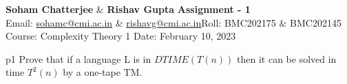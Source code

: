 \documentclass[a4paper, 11pt]{article}
\begin{document}
	
	
\textsf{\noindent \large\textbf{Soham Chatterjee} \& \textbf{Rishav Gupta} \hfill \textbf{Assignment - 1}\\
    Email: \href{sohamc@cmi.ac.in}{sohamc@cmi.ac.in} \& \href{rishavg@cmi.ac.in}{rishavg@cmi.ac.in}\hfill Roll: BMC202175 \& BMC202145\\
		\normalsize Course: Complexity Theory 1 \hfill Date: February 10, 2023}
	
	
	\begin{problem}{%
		}{p1%
		}
		Prove that if a language L is in $DTIME(T(n))$ then it can be solved in time $T^{2}(n)$ by a one-tape TM.		
	\end{problem}
	
\end{document}
